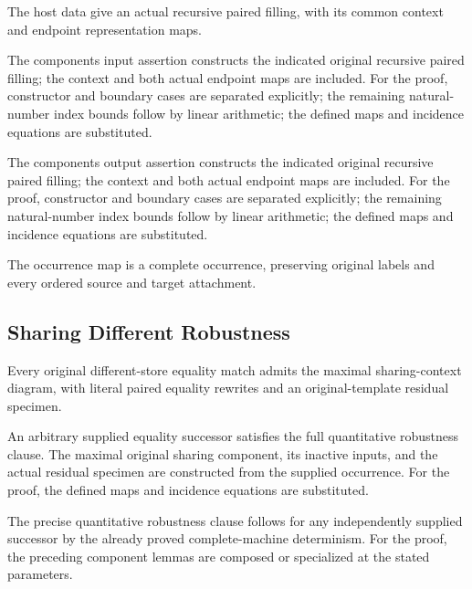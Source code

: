 The host data give an actual recursive paired filling, with its common context and endpoint representation maps.
\par{}

The components input assertion constructs the indicated original recursive paired filling; the context and both actual endpoint maps are included.
For the proof, constructor and boundary cases are separated explicitly; the remaining natural-number index bounds follow by linear arithmetic; the defined maps and incidence equations are substituted.
\par{}

The components output assertion constructs the indicated original recursive paired filling; the context and both actual endpoint maps are included.
For the proof, constructor and boundary cases are separated explicitly; the remaining natural-number index bounds follow by linear arithmetic; the defined maps and incidence equations are substituted.
\par{}

The occurrence map is a complete occurrence, preserving original labels and every ordered source and target attachment.
\par{}

\subsection{Sharing Different Robustness}
Every original different-store equality match admits the maximal sharing-context diagram, with literal paired equality rewrites and an original-template residual specimen.

An arbitrary supplied equality successor satisfies the full quantitative robustness clause. The maximal original sharing component, its inactive inputs, and the actual residual specimen are constructed from the supplied occurrence.
For the proof, the defined maps and incidence equations are substituted.
\par{}

The precise quantitative robustness clause follows for any independently supplied successor by the already proved complete-machine determinism.
For the proof, the preceding component lemmas are composed or specialized at the stated parameters.
\par{}


